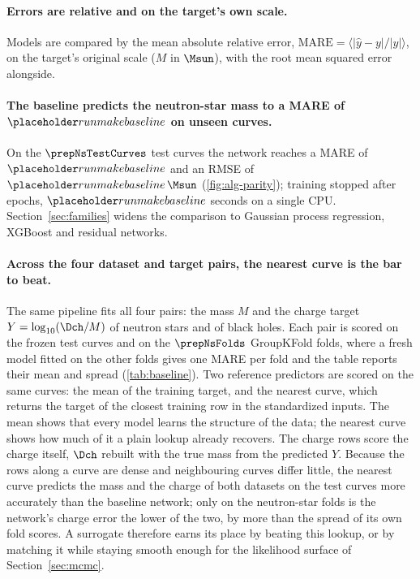 \paragraph{Errors are relative and on the target's own scale.}
Models are compared by the mean absolute relative error, $\mathrm{MARE} = \langle |\hat{y} - y| / |y| \rangle$, on the target's original scale ($M$ in $\Msun$), with the root mean squared error alongside.

\paragraph{The baseline predicts the neutron-star mass to a MARE of $\baseNsMassMare$ on unseen curves.}
On the $\prepNsTestCurves$ test curves the network reaches a MARE of $\baseNsMassMare$ and an RMSE of $\baseNsMassRmse\,\Msun$ (\cref{fig:alg-parity}); training stopped after \baseNsMassEpochs{} epochs, $\baseNsMassFitSeconds$ seconds on a single CPU. Section~\ref{sec:families} widens the comparison to Gaussian process regression, XGBoost and residual networks.

\paragraph{Across the four dataset and target pairs, the nearest curve is the bar to beat.}
The same pipeline fits all four pairs: the mass $M$ and the charge target $Y = \log_{10}(\Dch/M)$ of neutron stars and of black holes. Each pair is scored on the frozen test curves and on the $\prepNsFolds$ GroupKFold folds, where a fresh model fitted on the other folds gives one MARE per fold and the table reports their mean and spread (\cref{tab:baseline}). Two reference predictors are scored on the same curves: the mean of the training target, and the nearest curve, which returns the target of the closest training row in the standardized inputs. The mean shows that every model learns the structure of the data; the nearest curve shows how much of it a plain lookup already recovers. The charge rows score the charge itself, $\Dch$ rebuilt with the true mass from the predicted $Y$. Because the rows along a curve are dense and neighbouring curves differ little, the nearest curve predicts the mass and the charge of both datasets on the test curves more accurately than the baseline network; only on the neutron-star folds is the network's charge error the lower of the two, by more than the spread of its own fold scores. A surrogate therefore earns its place by beating this lookup, or by matching it while staying smooth enough for the likelihood surface of Section~\ref{sec:mcmc}.


